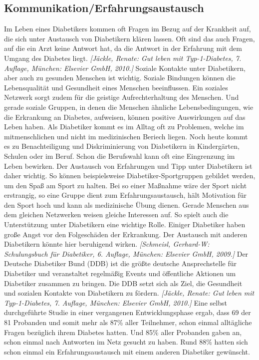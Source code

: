 \documentclass[a4paper,11pt]{article}%
\renewcommand{\\}{\vspace*{0.5\baselineskip} \newline}
\begin{document}
\subsection{Kommunikation/Erfahrungsaustausch}
	Im Leben eines Diabetikers kommen oft Fragen im Bezug auf der Krankheit auf, die sich unter Austausch von Diabetikern klären lassen. Oft sind das auch Fragen, auf die ein Arzt keine Antwort hat, da die Antwort in der Erfahrung mit dem Umgang des Diabetes liegt. \emph{[Jäckle, Renate: Gut leben mit Typ-1-Diabetes, 7. Auflage, München: Elsevier GmbH, 2010.]}\\
	Soziale Kontakte unter Diabetikern, aber auch zu gesunden Menschen ist wichtig. Soziale Bindungen können die Lebensqualität und Gesundheit eines Menschen beeinflussen. Ein soziales Netzwerk sorgt zudem für die geistige Aufrechterhaltung des Menschen. Und gerade soziale Gruppen, in denen die Menschen ähnliche Lebensbedingungen, wie die Erkrankung an Diabetes, aufweisen, können positive Auswirkungen auf das Leben haben. \newline
	Als Diabetiker kommt es im Alltag oft zu Problemen, welche im mitmenschlichen und nicht im medizinischen Beriech liegen. Noch heute kommt es zu Benachteiligung und Diskriminierung von Diabetikern in Kindergärten, Schulen oder im Beruf. Schon die Berufswahl kann oft eine Eingrenzung im Leben bewirken. Der Austausch von Erfahrungen und Tipp unter Diabetikern ist daher wichtig. So können beispielsweise Diabetiker-Sportgruppen gebildet werden, um den Spaß am Sport zu halten. Bei so einer Maßnahme wäre der Sport nicht erstrangig, so eine Gruppe dient zum Erfahrungsaustausch, hält Motivation für den Sport hoch und kann als medizinische Übung dienen. Gerade Menschen aus dem gleichen Netzwerken weisen gleiche Interessen auf. So spielt auch die Unterstützung unter Diabetikern eine wichtige Rolle. Einiger Diabetiker haben große Angst vor den Folgeschäden der Erkrankung. Der Austausch mit anderen Diabetikern könnte hier beruhigend wirken.  \emph{[Schmeisl, Gerhard-W: Schulungsbuch für Diabetiker, 6. Auflage, München: Elsevier GmbH, 2009.]} \newline
	Der Deutsche Diabetiker Bund (DDB) ist die größte deutsche Ansprechstelle für Diabetiker und veranstaltet regelmäßig Events und öffentliche Aktionen um Diabetiker zusammen zu bringen. Die DDB setzt sich als Ziel, die Gesundheit und sozialen Kontakte von Diabetikern zu fördern. \emph{[Jäckle, Renate: Gut leben mit Typ-1-Diabetes, 7. Auflage, München: Elsevier GmbH, 2010.]}\\
	Eine selbst durchgeführte Studie  in einer vergangenen Entwicklungsphase ergab, dass 69 der 81 Probanden und somit mehr als 87\% aller Teilnehmer, schon einmal alltägliche Fragen bezüglich ihrem Diabetes hatten. Und 85\% aller Probanden gaben an, schon einmal nach Antworten im Netz gesucht zu haben. Rund 88\% hatten sich schon einmal ein Erfahrungsaustausch mit einem anderen Diabetiker gewünscht.\\
\end{document}
